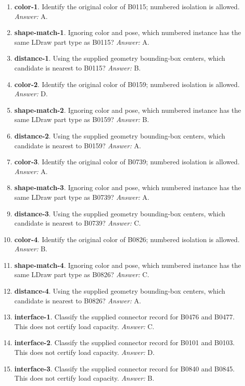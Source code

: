 \begin{enumerate}
\item \textbf{color-1}. Identify the original color of B0115; numbered isolation is allowed. \textit{Answer:} A.
\item \textbf{shape-match-1}. Ignoring color and pose, which numbered instance has the same LDraw part type as B0115? \textit{Answer:} A.
\item \textbf{distance-1}. Using the supplied geometry bounding-box centers, which candidate is nearest to B0115? \textit{Answer:} B.
\item \textbf{color-2}. Identify the original color of B0159; numbered isolation is allowed. \textit{Answer:} D.
\item \textbf{shape-match-2}. Ignoring color and pose, which numbered instance has the same LDraw part type as B0159? \textit{Answer:} B.
\item \textbf{distance-2}. Using the supplied geometry bounding-box centers, which candidate is nearest to B0159? \textit{Answer:} A.
\item \textbf{color-3}. Identify the original color of B0739; numbered isolation is allowed. \textit{Answer:} A.
\item \textbf{shape-match-3}. Ignoring color and pose, which numbered instance has the same LDraw part type as B0739? \textit{Answer:} A.
\item \textbf{distance-3}. Using the supplied geometry bounding-box centers, which candidate is nearest to B0739? \textit{Answer:} C.
\item \textbf{color-4}. Identify the original color of B0826; numbered isolation is allowed. \textit{Answer:} B.
\item \textbf{shape-match-4}. Ignoring color and pose, which numbered instance has the same LDraw part type as B0826? \textit{Answer:} C.
\item \textbf{distance-4}. Using the supplied geometry bounding-box centers, which candidate is nearest to B0826? \textit{Answer:} A.
\item \textbf{interface-1}. Classify the supplied connector record for B0476 and B0477. This does not certify load capacity. \textit{Answer:} C.
\item \textbf{interface-2}. Classify the supplied connector record for B0101 and B0103. This does not certify load capacity. \textit{Answer:} D.
\item \textbf{interface-3}. Classify the supplied connector record for B0840 and B0845. This does not certify load capacity. \textit{Answer:} B.

\end{enumerate}

